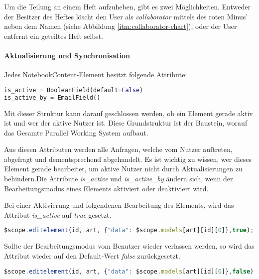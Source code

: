 Um die Teilung an einem Heft aufzuheben, gibt es zwei Möglichkeiten. Entweder der Besitzer des Heftes löscht den User als \textit{collaborator} mittels des roten Minus' neben dem Namen (siehe Abbildung \ref{itm:collaborator-chart}), oder der User entfernt ein geteiltes Heft selbst.
\paragraph{Aktualisierung und Synchronisation}
Jedes NotebookContent-Element besitzt folgende Attribute:
\begin{lstlisting}[caption={Parallel Working System Attribute}, language=Python]
is_active = BooleanField(default=False)
is_active_by = EmailField()
\end{lstlisting}
Mit dieser Struktur kann darauf geschlossen werden, ob ein Element gerade aktiv ist und wer der aktive Nutzer ist. Diese Grundstruktur ist der Baustein, worauf das Gesamte Parallel Working System aufbaut.

Aus diesen Attributen werden alle Anfragen, welche vom Nutzer auftreten, abgefragt und dementsprechend abgehandelt. Es ist wichtig zu wissen, wer dieses Element gerade bearbeitet, um aktive Nutzer nicht durch Aktualisierungen zu behindern.Die Attribute \textit{is\_active} und \textit{is\_active\_by} ändern sich, wenn der Bearbeitungsmodus eines Elements aktiviert oder deaktiviert wird.

\newpage

Bei einer Aktivierung und folgendenen Bearbeitung des Elements, wird das Attribut \textit{is\_active} auf \textit{true} gesetzt.
\begin{lstlisting}[caption={Bearbeitungsmodus true - PWS}, language=Javascript]
$scope.editelement(id, art, {"data": $scope.models[art][id][0]},true);
\end{lstlisting}

Sollte der Bearbeitungsmodus vom Benutzer wieder verlassen werden, so wird das Attribut wieder auf den Default-Wert \textit{false} zurückgesetzt.
\begin{lstlisting}[caption={Bearbeitungsmodus false - PWS}, language=Javascript]
$scope.editelement(id, art, {"data": $scope.models[art][id][0]},false);
\end{lstlisting}

